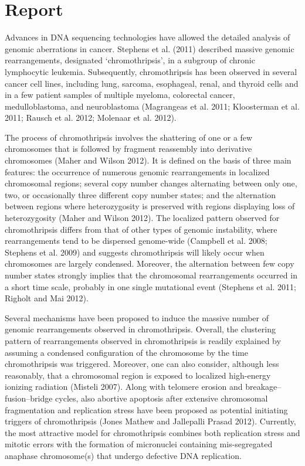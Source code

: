 \section*{Report}
Advances in DNA sequencing technologies have allowed the detailed analysis of genomic aberrations in cancer. Stephens et al. (2011) described massive genomic rearrangements, designated ‘chromothripsis’, in a subgroup of chronic lymphocytic leukemia. Subsequently, chromothripsis has been observed in several cancer cell lines, including lung, sarcoma, esophageal, renal, and thyroid cells and in a few patient samples of multiple myeloma, colorectal cancer, medulloblastoma, and neuroblastoma (Magrangeas et al. 2011; Kloosterman et al. 2011; Rausch et al. 2012; Molenaar et al. 2012).

The process of chromothripsis involves the shattering of one or a few chromosomes that is followed by fragment reassembly into derivative chromosomes (Maher and Wilson 2012). It is defined on the basis of three main features: the occurrence of numerous genomic rearrangements in localized chromosomal regions; several copy number changes alternating between only one, two, or occasionally three different copy number states; and the alternation between regions where heterozygosity is preserved with regions displaying loss of heterozygosity (Maher and Wilson 2012). The localized pattern observed for chromothripsis differs from that of other types of genomic instability, where rearrangements tend to be dispersed genome-wide (Campbell et al. 2008; Stephens et al. 2009) and suggests chromothripsis will likely occur when chromosomes are largely condensed. Moreover, the alternation between few copy number states strongly implies that the chromosomal rearrangements occurred in a short time scale, probably in one single mutational event (Stephens et al. 2011; Righolt and Mai 2012).

Several mechanisms have been proposed to induce the massive number of genomic rearrangements observed in chromothripsis. Overall, the clustering pattern of rearrangements observed in chromothripsis is readily explained by assuming a condensed configuration of the chromosome by the time chromothripsis was triggered. Moreover, one can also consider, although less reasonably, that a chromosomal region is exposed to localized high-energy ionizing radiation (Misteli 2007). Along with telomere erosion and breakage–fusion–bridge cycles, also abortive apoptosis after extensive chromosomal fragmentation and replication stress have been proposed as potential initiating triggers of chromothripsis (Jones Mathew and Jallepalli Prasad 2012). Currently, the most attractive model for chromothripsis combines both replication stress and mitotic errors with the formation of micronuclei containing mis-segregated anaphase chromosome(s) that undergo defective DNA replication.

